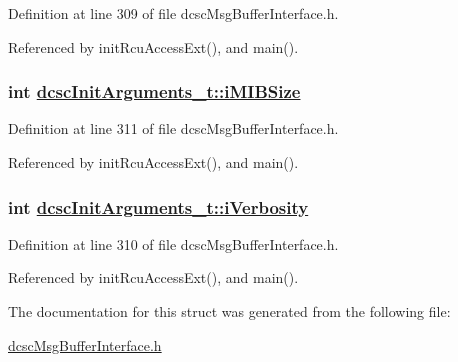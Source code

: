 Definition at line 309 of file dcsc\-Msg\-Buffer\-Interface.h.

Referenced by init\-Rcu\-Access\-Ext(), and main().\hypertarget{structdcscInitArguments__t_5faecf13bfb7cb86647f13a38d37ccac}{
\subsubsection[iMIBSize]{\setlength{\rightskip}{0pt plus 5cm}int \hyperlink{structdcscInitArguments__t_5faecf13bfb7cb86647f13a38d37ccac}{dcsc\-Init\-Arguments\_\-t::i\-MIBSize}}}
\label{structdcscInitArguments__t_5faecf13bfb7cb86647f13a38d37ccac}




Definition at line 311 of file dcsc\-Msg\-Buffer\-Interface.h.

Referenced by init\-Rcu\-Access\-Ext(), and main().\hypertarget{structdcscInitArguments__t_5ea3b80cc981315aa7508ba54653b57a}{
\subsubsection[iVerbosity]{\setlength{\rightskip}{0pt plus 5cm}int \hyperlink{structdcscInitArguments__t_5ea3b80cc981315aa7508ba54653b57a}{dcsc\-Init\-Arguments\_\-t::i\-Verbosity}}}
\label{structdcscInitArguments__t_5ea3b80cc981315aa7508ba54653b57a}




Definition at line 310 of file dcsc\-Msg\-Buffer\-Interface.h.

Referenced by init\-Rcu\-Access\-Ext(), and main().

The documentation for this struct was generated from the following file:\begin{CompactItemize}
\item 
\hyperlink{dcscMsgBufferInterface_8h}{dcsc\-Msg\-Buffer\-Interface.h}\end{CompactItemize}
